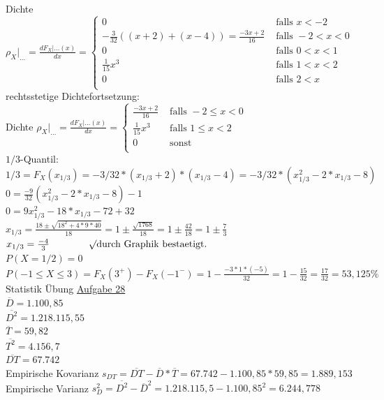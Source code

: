 \documentclass[12pt]{article} %
\newcommand{\aufgabe}[1]{{\huge Statistik Übung \underline{Aufgabe #1}}\\[3.5ex]  }
\begin{document}
Dichte $\rho_X |_{\ldots} = \frac{dF_X | {\ldots} (x)}{dx} = 
\begin{cases}
0 
& \text{ falls } x<-2 \\
-\frac{3}{32}((x+2)+(x-4)) = \frac{-3x + 2}{16}
& \text{ falls } -2 < x<0\\
0
& \text{ falls } 0 < x<1\\
\frac{1}{15}x^3
& \text{ falls } 1 < x<2\\
0
& \text{ falls } 2 < x\\
\end{cases}$\\
rechtsstetige Dichtefortsetzung: \\
Dichte $\rho_X |_{\ldots} = \frac{dF_X | {\ldots} (x)}{dx} = 
\begin{cases}
\frac{-3x + 2}{16}
& \text{ falls } -2 \leq x<0\\
\frac{1}{15}x^3
& \text{ falls } 1 \leq x<2\\
0
& \text{ sonst } \\
\end{cases}$\\
$1/3$-Quantil: $1 / 3 = F_X(x_{1/3}) = -3/32 * (x_{1/3} + 2) * (x_{1/3} - 4) = -3/32 * (x_{1/3}^2 - 2 * x_{1/3} - 8)$\\
$0 = \frac{-9}{32} (x_{1/3}^2 - 2 * x_{1/3} - 8) - 1 $\\
$0 = 9 x_{1/3}^2 - 18 * x_{1/3} - 72+32$\\
$x_{1/3} = \frac{18 \pm \sqrt{18^2+4*9*40}}{18} = 1 \pm \frac{\sqrt{1768}}{18} = 1 \pm \frac{42}{18} = 1 \pm \frac{7}{3}$\\
$x_{1/3} = \frac{-4}{3} \qquad \qquad \surd \text{durch Graphik bestaetigt. }$\\[1ex]
$P(X=1/2) = 0$ \\[1ex]
$P(-1 \leq X \leq 3) = F_X(3^{+}) - F_X(-1^{-}) = 1 - \frac{-3*1*(-5)}{32} = 1-\frac{15}{32} = \frac{17}{32} = 53,125\% $\\[1ex]
\newpage
\aufgabe{28}
$\overline{D} = 1.100,85 $\\
$\overline{D^2} = 1.218.115,55 $\\
$\overline{T} = 59,82 $\\
$\overline{T^2} = 4.156,7 $\\
$\overline{DT} = 67.742 $\\
Empirische Kovarianz $s_{DT} = \overline{DT} - \overline{D} * \overline{T} = 67.742 - 1.100,85 * 59,85 = 1.889,153$ \\
Empirische Varianz $s_{D}^2 = \overline{D^2} - \overline{D}^2 = 1.218.115,5 - 1.100,85^2 = 6.244,778$ \\
\end{document}
